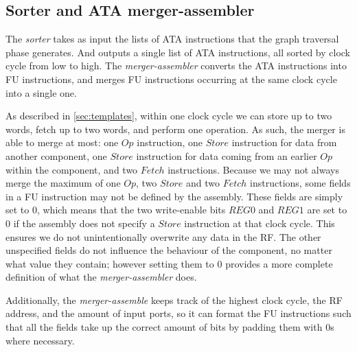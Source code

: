 \subsection*{Sorter and ATA merger-assembler}
The \textit{sorter} takes as input the lists of ATA instructions that the graph traversal phase generates. And outputs a single list of ATA instructions, all sorted by clock cycle from low to high. The \textit{merger-assembler} converts the ATA instructions into FU instructions, and merges FU instructions occurring at the same clock cycle into a single one.

As described in \ref{sec:templates}, within one clock cycle we can store up to two words, fetch up to two words, and perform one operation. As such, the merger is able to merge at most: one $Op$ instruction, one $Store$ instruction for data from another component, one $Store$ instruction for data coming from an earlier $Op$ within the component, and two $Fetch$ instructions. Because we may not always merge the maximum of one $Op$, two $Store$ and two $Fetch$ instructions, some fields in a FU instruction may not be defined by the assembly. These fields are simply set to 0, which means that the two write-enable bits $REG0$ and $REG1$ are set to 0 if the assembly does not specify a $Store$ instruction at that clock cycle. This ensures we do not unintentionally overwrite any data in the RF. The other unspecified fields do not influence the behaviour of the component, no matter what value they contain; however setting them to 0 provides a more complete definition of what the \textit{merger-assembler} does.


Additionally, the \textit{merger-assemble} keeps track of the highest clock cycle, the RF address, and the amount of input ports, so it can format the FU instructions such that all the fields take up the correct amount of bits by padding them with 0s where necessary.


